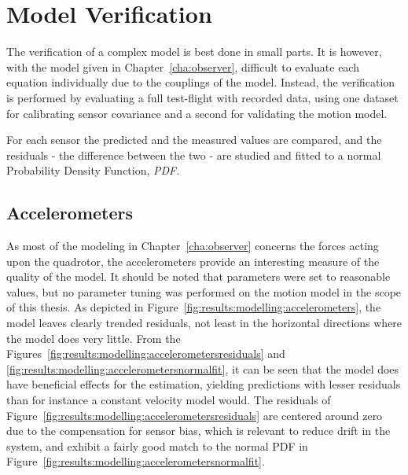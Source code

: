 \section{Model Verification}
\label{sec:results:modelling}
    The verification of a complex model is best done in small parts.
    It is however, with the model given in Chapter~\ref{cha:observer},
    difficult to evaluate each equation individually due to the couplings of the model.
    Instead, the verification is performed by evaluating a full test-flight
    with recorded data, using one dataset for calibrating sensor covariance
    and a second for validating the motion model.

    For each sensor the predicted and the measured values are compared,
    and the residuals - the difference between the two - are studied and
    fitted to a normal Probability Density Function, \textit{PDF}.

    \subsection{Accelerometers}
        \label{ssec:results:modelling:accelerometers}
        As most of the modeling in Chapter~\ref{cha:observer} concerns
        the forces acting upon the quadrotor, the accelerometers
        provide an interesting measure of the quality of the model.
        It should be noted that parameters were set to reasonable values,
        but no parameter tuning was performed on the motion model in the scope of this thesis.
        As depicted in Figure~\ref{fig:results:modelling:accelerometers},
        the model leaves clearly trended residuals, not least in the
        horizontal directions where the model does very little.
        From the Figures~\ref{fig:results:modelling:accelerometersresiduals} and \ref{fig:results:modelling:accelerometersnormalfit},
        it can be seen that the model does have beneficial
        effects for the estimation, yielding predictions with lesser residuals
        than for instance a constant velocity model would.
        The residuals of Figure~\ref{fig:results:modelling:accelerometersresiduals}
        are centered around zero due to the compensation
        for sensor bias, which is relevant to reduce drift in the system,
        and exhibit a fairly good match to the normal PDF in Figure~\ref{fig:results:modelling:accelerometersnormalfit}.

